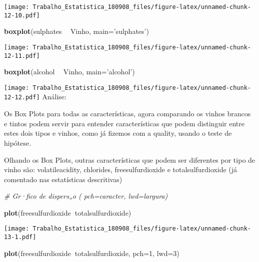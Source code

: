 \documentclass[]{article}
\newenvironment{Shaded}{\begin{snugshade}}{\end{snugshade}}
\newcommand{\KeywordTok}[1]{\textcolor[rgb]{0.13,0.29,0.53}{\textbf{#1}}}
\newcommand{\DataTypeTok}[1]{\textcolor[rgb]{0.13,0.29,0.53}{#1}}
\newcommand{\DecValTok}[1]{\textcolor[rgb]{0.00,0.00,0.81}{#1}}
\newcommand{\StringTok}[1]{\textcolor[rgb]{0.31,0.60,0.02}{#1}}
\newcommand{\CommentTok}[1]{\textcolor[rgb]{0.56,0.35,0.01}{\textit{#1}}}
\newcommand{\OperatorTok}[1]{\textcolor[rgb]{0.81,0.36,0.00}{\textbf{#1}}}
\newcommand{\NormalTok}[1]{#1}
\begin{document}
\texttt{[image: Trabalho\_Estatistica\_180908\_files/figure-latex/unnamed-chunk-12-10.pdf]}

\begin{Shaded}
\begin{Highlighting}[]
\KeywordTok{boxplot}\NormalTok{(sulphates }\OperatorTok{~}\StringTok{ }\NormalTok{Vinho, }\DataTypeTok{main=}\StringTok{'sulphates'}\NormalTok{)}
\end{Highlighting}
\end{Shaded}

\texttt{[image: Trabalho\_Estatistica\_180908\_files/figure-latex/unnamed-chunk-12-11.pdf]}

\begin{Shaded}
\begin{Highlighting}[]
\KeywordTok{boxplot}\NormalTok{(alcohol }\OperatorTok{~}\StringTok{ }\NormalTok{Vinho, }\DataTypeTok{main=}\StringTok{'alcohol'}\NormalTok{)}
\end{Highlighting}
\end{Shaded}

\texttt{[image: Trabalho\_Estatistica\_180908\_files/figure-latex/unnamed-chunk-12-12.pdf]}
Análise:

Os Box Plots para todas as características, agora comparando os vinhos
brancos e tintos podem servir para entender características que podem
distinguir entre estes dois tipos e vinhos, como já fizemos com a
quality, usando o teste de hipótese.

Olhando os Box Plots, outras características que podem ser diferentes
por tipo de vinho são: volatileacidity, chlorides, freesulfurdioxide e
totalsulfurdioxide (já comentado nas estatísticas descritivas)

\begin{Shaded}
\begin{Highlighting}[]
\CommentTok{# Gr·fico de dispers„o ( pch=caracter, lwd=largura)}

\KeywordTok{plot}\NormalTok{(freesulfurdioxide}\OperatorTok{~}\NormalTok{totalsulfurdioxide)}
\end{Highlighting}
\end{Shaded}

\texttt{[image: Trabalho\_Estatistica\_180908\_files/figure-latex/unnamed-chunk-13-1.pdf]}

\begin{Shaded}
\begin{Highlighting}[]
\KeywordTok{plot}\NormalTok{(freesulfurdioxide}\OperatorTok{~}\NormalTok{totalsulfurdioxide, }\DataTypeTok{pch=}\DecValTok{1}\NormalTok{, }\DataTypeTok{lwd=}\DecValTok{3}\NormalTok{)}
\end{Highlighting}
\end{Shaded}
\end{document}
